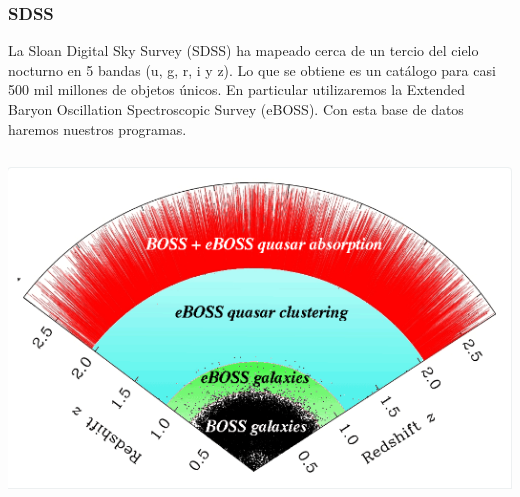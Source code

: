 \documentclass{beamer}
\begin{document}
\begin{frame}
\frametitle{SDSS}
La Sloan Digital Sky Survey (SDSS) ha mapeado cerca de un tercio del cielo nocturno en 5 bandas (u, g, r, i y z). Lo que se obtiene es un catálogo para casi 500 mil millones de objetos únicos. En particular utilizaremos la Extended Baryon Oscillation Spectroscopic Survey (eBOSS). Con esta base de datos haremos nuestros programas.

\begin{columns}
	\begin{column}{6cm}
		\includegraphics[width=\columnwidth]{eBoss.png} 
	\end{column}
\end{columns}

\end{frame}

%
\end{document}
